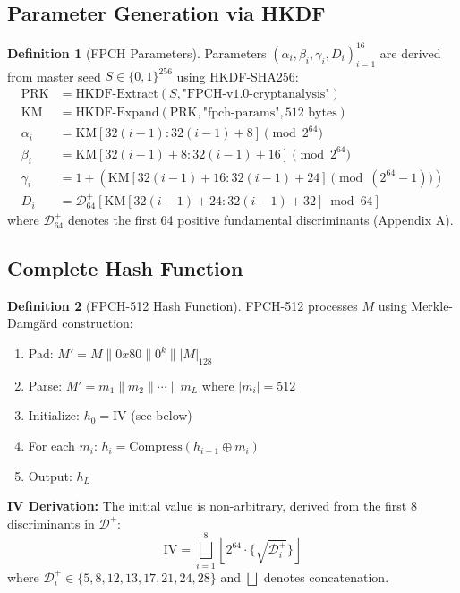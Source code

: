 \documentclass[11pt,a4paper]{article}
\theoremstyle{plain}
\theoremstyle{definition}
\newtheorem{definition}{Definition}[section]
\theoremstyle{remark}
\begin{document}
\subsection{Parameter Generation via HKDF}

\begin{definition}[FPCH Parameters]\label{def:params}
Parameters $(\alpha_i, \beta_i, \gamma_i, D_i)_{i=1}^{16}$ are derived from master seed $S \in \{0,1\}^{256}$ using HKDF-SHA256:
\begin{align}
\text{PRK} &= \text{HKDF-Extract}(S, \text{"FPCH-v1.0-cryptanalysis"}) \\
\text{KM} &= \text{HKDF-Expand}(\text{PRK}, \text{"fpch-params"}, 512 \text{ bytes}) \\
\alpha_i &= \text{KM}[32(i-1) : 32(i-1)+8] \pmod{2^{64}} \\
\beta_i &= \text{KM}[32(i-1)+8 : 32(i-1)+16] \pmod{2^{64}} \\
\gamma_i &= 1 + (\text{KM}[32(i-1)+16 : 32(i-1)+24] \pmod{(2^{64}-1)}) \\
D_i &= \mathcal{D}^+_{64}[\text{KM}[32(i-1)+24 : 32(i-1)+32] \bmod 64]
\end{align}
where $\mathcal{D}^+_{64}$ denotes the first 64 positive fundamental discriminants (Appendix A).
\end{definition}

\subsection{Complete Hash Function}

\begin{definition}[FPCH-512 Hash Function]\label{def:hash512}
FPCH-512 processes $M$ using Merkle-Damg\"ard construction:
\begin{enumerate}
    \item Pad: $M' = M \| 0x80 \| 0^{k} \| |M|_{128}$
    \item Parse: $M' = m_1 \| m_2 \| \cdots \| m_L$ where $|m_i| = 512$
    \item Initialize: $h_0 = \text{IV}$ (see below)
    \item For each $m_i$: $h_i = \text{Compress}(h_{i-1} \oplus m_i)$
    \item Output: $h_L$
\end{enumerate}

\textbf{IV Derivation:} The initial value is non-arbitrary, derived from the first 8 discriminants in $\mathcal{D}^+$:
\begin{equation}
\text{IV} = \bigsqcup_{i=1}^{8} \left\lfloor 2^{64} \cdot \{\sqrt{\mathcal{D}^+_i}\} \right\rfloor
\end{equation}
where $\mathcal{D}^+_i \in \{5, 8, 12, 13, 17, 21, 24, 28\}$ and $\bigsqcup$ denotes concatenation.
\end{definition}
\end{document}
